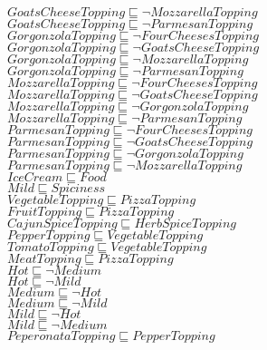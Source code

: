 \documentclass[a4paper,10pt]{article}
\begin{document}
 $GoatsCheeseTopping \sqsubseteq  \lnot MozzarellaTopping$\\ 
 $GoatsCheeseTopping \sqsubseteq  \lnot ParmesanTopping$\\ 
 $GorgonzolaTopping \sqsubseteq  \lnot FourCheesesTopping$\\ 
 $GorgonzolaTopping \sqsubseteq  \lnot GoatsCheeseTopping$\\ 
 $GorgonzolaTopping \sqsubseteq  \lnot MozzarellaTopping$\\ 
 $GorgonzolaTopping \sqsubseteq  \lnot ParmesanTopping$\\ 
 $MozzarellaTopping \sqsubseteq  \lnot FourCheesesTopping$\\ 
 $MozzarellaTopping \sqsubseteq  \lnot GoatsCheeseTopping$\\ 
 $MozzarellaTopping \sqsubseteq  \lnot GorgonzolaTopping$\\ 
 $MozzarellaTopping \sqsubseteq  \lnot ParmesanTopping$\\ 
 $ParmesanTopping \sqsubseteq  \lnot FourCheesesTopping$\\ 
 $ParmesanTopping \sqsubseteq  \lnot GoatsCheeseTopping$\\ 
 $ParmesanTopping \sqsubseteq  \lnot GorgonzolaTopping$\\ 
 $ParmesanTopping \sqsubseteq  \lnot MozzarellaTopping$\\ 
 $IceCream \sqsubseteq Food$\\ 
 $Mild \sqsubseteq Spiciness$\\ 
 $VegetableTopping \sqsubseteq PizzaTopping$\\ 
 $FruitTopping \sqsubseteq PizzaTopping$\\ 
 $CajunSpiceTopping \sqsubseteq HerbSpiceTopping$\\ 
 $PepperTopping \sqsubseteq VegetableTopping$\\ 
 $TomatoTopping \sqsubseteq VegetableTopping$\\ 
 $MeatTopping \sqsubseteq PizzaTopping$\\ 
 $Hot \sqsubseteq  \lnot Medium$\\ 
 $Hot \sqsubseteq  \lnot Mild$\\ 
 $Medium \sqsubseteq  \lnot Hot$\\ 
 $Medium \sqsubseteq  \lnot Mild$\\ 
 $Mild \sqsubseteq  \lnot Hot$\\ 
 $Mild \sqsubseteq  \lnot Medium$\\ 
 $PeperonataTopping \sqsubseteq PepperTopping$\\ 
\end{document}
